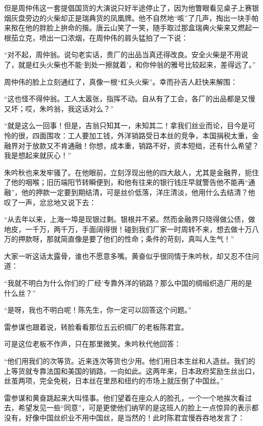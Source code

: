\par 但是周仲伟这一套提倡国货的大演说只好半途停止了，因为他瞥眼看见桌子上赛银烟灰盘旁边的火柴却正是瑞典货的凤凰牌。他不自然地“咳”了几声，掏出一块手帕来揿在他的胖脸上拚命的揩。唐云山笑了一笑，随手取过那盒瑞典火柴来又燃起一根茄立克，喷出一口浓烟，在周仲伟的肩头猛拍了一下说：
\par “对不起，周仲翁。说句老实话，贵厂的出品当真还得改良。安全火柴是不用说了，就是红头火柴也不能‘到处一擦就着’，和你仲翁的雅号比较起来，差得远了。”
\par 周仲伟的脸上立刻通红了，真像一根“红头火柴”。幸而孙吉人赶快来解围：
\par “这也怪不得仲翁。工人太嚣张，指挥不动。自从有了工会，各厂的出品都是又慢又坏；哎，朱吟翁，我这话对么？”
\par “就是这么一回事！但是，吉翁只知其一，未知其二！拿我们丝业而论，目今是可怜的很，四面围攻：工人要加工钱，外洋销路受日本丝的竞争，本国捐税太重，金融界对于放款又不肯通融！你想，成本重，销路不好，资本短绌，还有什么希望？我是想起来就灰心！”
\par 朱吟秋也来发牢骚了。在他眼前，立刻浮现出他的四大敌人，尤其是金融界，扼住了他的咽喉；旧历端阳节转瞬便到，和他有往来的银行钱庄早就警告他不能再“通融”，他的押款一定要到期结清，可是丝价低落，洋庄清淡，他用什么去结清？他叹了一声，忿忿地又说下去：
\par “从去年以来，上海一埠是现银过剩。银根并不紧。然而金融界只晓得做公债，做地皮，一千万，两千万，手面阔得很！碰到我们厂家一时周转不来，想去做十万八万的押款呀，那就简直像是要了他们的性命；条件的苛刻，真叫人生气！”
\par 大家一听这话太露骨，谁也不愿意多嘴。黄奋似乎很同情于朱吟秋，却又忍不住问道：
\par “我就不明白为什么你们的‘厂经’专靠外洋的销路？那么中国的绸缎织造厂用的是什么丝？”
\par “是呀，我也不明白呢！陈先生，你一定可以回答这个问题。”
\par 雷参谋也跟着说，转脸看看那位五云织绸厂的老板陈君宜。
\par 可是这位老板不作声，只在那里微笑。朱吟秋代他回答：
\par “他们用我们的次等货。近来连次等货也少用。他们用日本生丝和人造丝。我们的上等货就专靠法国和美国的销路，一向如此。这两年来，日本政府奖励生丝出口，丝茧两项，完全免税，日本丝在里昂和纽约的市场上就压倒了中国丝。”
\par 雷参谋和黄奋跳起来大叫怪事。他们望着在座众人的脸孔，一个一个地挨次看过去，希望发见一些“同意”，可是更使他们纳罕的是这班人的脸上一点惊异的表示都没有，好像中国丝织业不用中国丝，是当然的！此时陈君宜慢吞吞地发言了：
